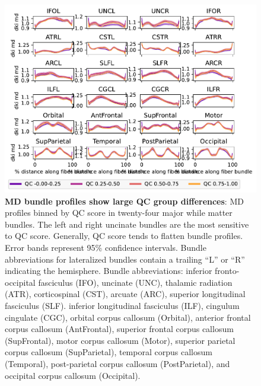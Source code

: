 \documentclass[fleqn,10pt]{wlscirep}
\begin{document}
\begin{figure}[tbp]
    \centering
    \includegraphics[width=\linewidth]{bundle-profiles/qc-bins-dki-md.pdf}
    \caption{%
        {\bf MD bundle profiles show large QC group differences}:
        MD profiles binned by QC score in twenty-four major while matter
        bundles. The left and right uncinate bundles are the most sensitive
        to QC score. Generally, QC score tends to flatten bundle profiles.
        Error bands represent 95\% confidence intervals. Bundle abbreviations
        for lateralized bundles contain a trailing ``L'' or ``R'' indicating the
        hemisphere. Bundle abbreviations:
        inferior fronto-occipital fasciculus (IFO),
        uncinate (UNC),
        thalamic radiation (ATR),
        corticospinal (CST),
        arcuate (ARC),
        superior longitudinal fasciculus (SLF).
        inferior longitudinal fasciculus (ILF),
        cingulum cingulate (CGC),
        orbital corpus callosum (Orbital),
        anterior frontal corpus callosum (AntFrontal),
        superior frontal corpus callosum (SupFrontal),
        motor corpus callosum (Motor),
        superior parietal corpus callosum (SupParietal),
        temporal corpus callosum (Temporal),
        post-parietal corpus callosum (PostParietal), and
        occipital corpus callosum (Occipital).
    }
    \label{fig:qc-profiles:md}
\end{figure}

\end{document}
